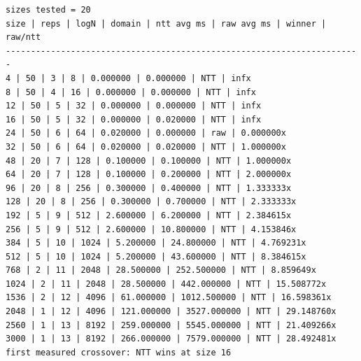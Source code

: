\documentclass[a4paper,12pt]{report}
\begin{document}
\begin{verbatim}
sizes tested = 20
size | reps | logN | domain | ntt avg ms | raw avg ms | winner | raw/ntt
-----------------------------------------------------------------------
4 | 50 | 3 | 8 | 0.000000 | 0.000000 | NTT | infx
8 | 50 | 4 | 16 | 0.000000 | 0.000000 | NTT | infx
12 | 50 | 5 | 32 | 0.000000 | 0.000000 | NTT | infx
16 | 50 | 5 | 32 | 0.000000 | 0.020000 | NTT | infx
24 | 50 | 6 | 64 | 0.020000 | 0.000000 | raw | 0.000000x
32 | 50 | 6 | 64 | 0.020000 | 0.020000 | NTT | 1.000000x
48 | 20 | 7 | 128 | 0.100000 | 0.100000 | NTT | 1.000000x
64 | 20 | 7 | 128 | 0.100000 | 0.200000 | NTT | 2.000000x
96 | 20 | 8 | 256 | 0.300000 | 0.400000 | NTT | 1.333333x
128 | 20 | 8 | 256 | 0.300000 | 0.700000 | NTT | 2.333333x
192 | 5 | 9 | 512 | 2.600000 | 6.200000 | NTT | 2.384615x
256 | 5 | 9 | 512 | 2.600000 | 10.800000 | NTT | 4.153846x
384 | 5 | 10 | 1024 | 5.200000 | 24.800000 | NTT | 4.769231x
512 | 5 | 10 | 1024 | 5.200000 | 43.600000 | NTT | 8.384615x
768 | 2 | 11 | 2048 | 28.500000 | 252.500000 | NTT | 8.859649x
1024 | 2 | 11 | 2048 | 28.500000 | 442.000000 | NTT | 15.508772x
1536 | 2 | 12 | 4096 | 61.000000 | 1012.500000 | NTT | 16.598361x
2048 | 1 | 12 | 4096 | 121.000000 | 3527.000000 | NTT | 29.148760x
2560 | 1 | 13 | 8192 | 259.000000 | 5545.000000 | NTT | 21.409266x
3000 | 1 | 13 | 8192 | 266.000000 | 7579.000000 | NTT | 28.492481x
first measured crossover: NTT wins at size 16
\end{verbatim}
\end{document}
